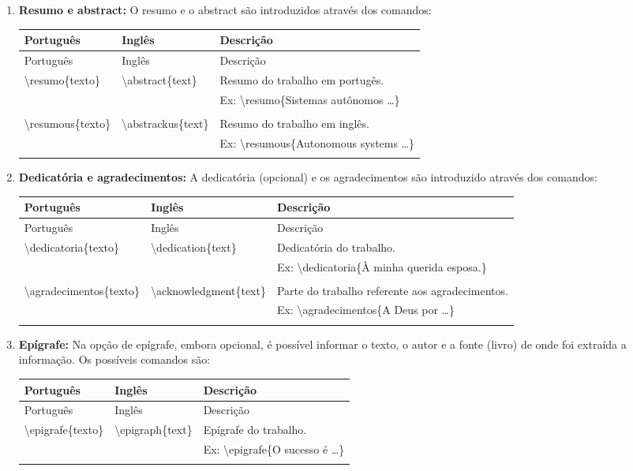 \documentclass{book}
\newcommand{\bs}{\textbackslash}
\newcommand{\nl}{\\ & &}
\newcommand{\newrow}[4]{
  \bs #1 & \bs #2 & #3 \nl
                    #4 \nl \\
}
\newenvironment{mytable}{
\begin{longtable}{ p{4.8cm} p{4.3cm} p{8cm} }

\hline
  Português      & Inglês     & Descrição  \\
  \hline
\endfirsthead

\hline
  Português      & Inglês     & Descrição  \\
  \hline
\endhead

\hline
\endfoot
}{
\end{longtable}
}
\begin{document}
\begin{enumerate}
\begin{mytable}
    \bs chavesus\{                & \bs keywordsus\{ &  Palavras-chaves do trabalho em inglês. \\
    \indent \bs chave\{texto\}  &\indent \bs key\{text\} & Ex: \bs chavesus\{ \\
    \indent \vdots     &\indent \vdots  & \hspace{0.5cm} \bs chave\{numerical simulation\} \\
    \}                        & \}    & \} \\
    &&\\
    \hline
  \end{mytable}   

  \item \textbf{Resumo e abstract:} O resumo e o abstract são introduzidos através dos comandos:

  \begin{mytable}      
     \newrow{resumo\{texto\}}{abstract\{text\}}
           {Resumo do trabalho em portugês.}
           {Ex: \bs resumo\{Sistemas autônomos \ldots\}}
           
    \newrow{resumous\{texto\}}{abstrackus\{text\}}
           {Resumo do trabalho em inglês.}
           {Ex: \bs resumous\{Autonomous systems \ldots\}}
  \end{mytable}   

  \item \textbf{Dedicatória e agradecimentos:} A dedicatória (opcional) e os agradecimentos são introduzido através dos comandos:

  \begin{mytable}        
     \newrow{dedicatoria\{texto\}}{dedication\{text\}}
           {Dedicatória do trabalho.}
           {Ex: \bs dedicatoria\{À minha querida esposa.\}}
           
     \newrow{agradecimentos\{texto\}}{acknowledgment\{text\}}
           {Parte do trabalho referente aos agradecimentos.}
           {Ex: \bs agradecimentos\{A Deus por \ldots\}}
  \end{mytable}  

  \item \textbf{Epígrafe:} Na opção de epígrafe, embora opcional, é possível informar o texto, o autor e a fonte (livro) de onde foi extraída a informação. Os possíveis comandos são:

  \begin{mytable}
     \newrow{epigrafe\{texto\}}{epigraph\{text\}}
           {Epígrafe do trabalho.}
           {Ex: \bs epigrafe\{O sucesso é \ldots\}}
           

\end{mytable}
\end{enumerate}
\end{document}
